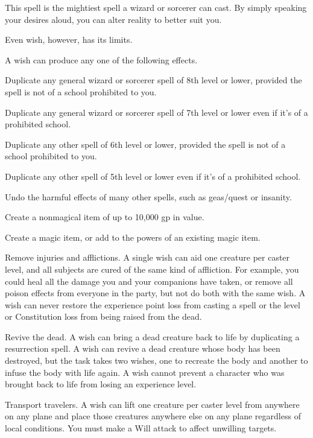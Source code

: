 \begin{spelleffect}
  This spell is the mightiest spell a wizard or sorcerer can cast. By simply speaking your desires aloud, you can alter reality to better suit you.
  \par Even wish, however, has its limits.
  \par A wish can produce any one of the following effects.
  \begin{itemize*}
    \item Duplicate any general wizard or sorcerer spell of 8th level or lower, provided the spell is not of a school prohibited to you.
    \item Duplicate any general wizard or sorcerer spell of 7th level or lower even if it's of a prohibited school.
    \item Duplicate any other spell of 6th level or lower, provided the spell is not of a school prohibited to you.
    \item Duplicate any other spell of 5th level or lower even if it's of a prohibited school. 
    \item Undo the harmful effects of many other spells, such as geas/quest or insanity.
    \item Create a nonmagical item of up to 10,000 gp in value.
    \item Create a magic item, or add to the powers of an existing magic item.
    \item Remove injuries and afflictions. A single wish can aid one creature per caster level, and all subjects are cured of the same kind of affliction. For example, you could heal all the damage you and your companions have taken, or remove all poison effects from everyone in the party, but not do both with the same wish. A wish can never restore the experience point loss from casting a spell or the level or Constitution loss from being raised from the dead.
    \item Revive the dead. A wish can bring a dead creature back to life by duplicating a resurrection spell. A wish can revive a dead creature whose body has been destroyed, but the task takes two wishes, one to recreate the body and another to infuse the body with life again. A wish cannot prevent a character who was brought back to life from losing an experience level.
    \item Transport travelers. A wish can lift one creature per caster level from anywhere on any plane and place those creatures anywhere else on any plane regardless of local conditions. You must make a Will attack to affect unwilling targets.

\end{itemize*}
\end{spelleffect}
